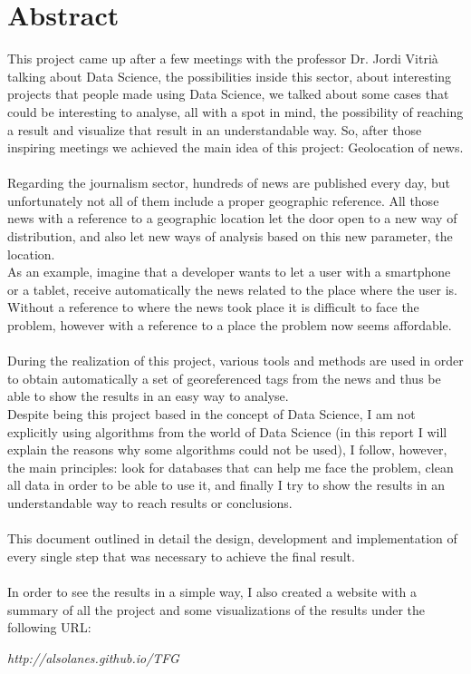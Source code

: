 \documentclass[12pt,a4paper,openright,oneside]{article}
\numberwithin{equation}{section}
\theoremstyle{definition}
\begin{document}
\newpage
{} 

\section*{Abstract} 
This project came up after a few meetings with the professor Dr. Jordi Vitrià talking about Data Science, the possibilities inside this sector, about interesting projects that people made using Data Science, we talked about some cases that could be interesting to analyse, all with a spot in mind, the possibility of reaching a result and visualize that result in an understandable way. So, after those inspiring meetings we achieved the main idea of this project: Geolocation of news. \\ \\
Regarding the journalism sector, hundreds of news are published every day, but unfortunately not all of them include a proper geographic reference. All those news with a reference to a geographic location let the door open to a new way of distribution, and also let new ways of analysis based on this new parameter, the location. \\
As an example, imagine that a developer wants to let a user with a smartphone or a tablet, receive automatically the news related to the place where the user is. Without a reference to where the news took place it is difficult to face the problem, however with a reference to a place the problem now seems affordable.\\ \\
During the realization of this project, various tools and methods are used in order to obtain automatically a set of georeferenced tags from the news and thus be able to show the results in an easy way to analyse. \\
Despite being this project based in the concept of Data Science, I am not explicitly  using algorithms from the world of Data Science (in this report I will explain the reasons why some algorithms could not be used), I follow, however, the main principles: look for databases that can help me face the problem, clean all data in order to be able to use it, and finally I try to show the results in an understandable way to reach results or conclusions. \\ \\
This document outlined in detail the design, development and implementation of every single step that was necessary to achieve the final result.\\ \\
In order to see the results in a simple way, I also created a website with a summary of all the project and some visualizations of the results under the following URL:\\
\begin{center}
\emph{http://alsolanes.github.io/TFG}
\end{center}
\newpage
\end{document}
